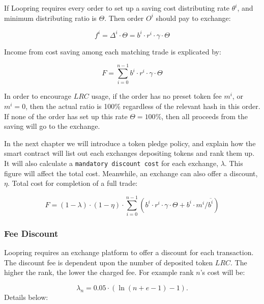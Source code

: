 \documentclass[UTF8,nofonts]{article}
\begin{document}
If Loopring requires every order to set up a saving cost distributing rate $\theta^i$, and minimum distributing ratio is $\Theta$. Then order $O^i$ should pay to exchange: 


\begin{equation*}
f^i = \Delta^i \cdot \Theta = b^i \cdot r^i \cdot \gamma \cdot \Theta
\end{equation*}

Income from cost saving among each matching trade is explicated by:

\begin{equation*}
F = \sum^{n-1}_{i=0} b^i \cdot r^i \cdot \gamma \cdot \Theta
\end{equation*}

In order to encourage $LRC$ usage, if the order has no preset token fee $m^i$, or $m^i=0$, then the actual ratio is 100\% regardless of the relevant hash in this order. If none of the order has set up this rate $\Theta=100\%$, then all proceeds from the saving will go to the exchange.

In the next chapter we will introduce a token pledge policy, and explain how the smart contract will list out each exchanges depositing tokens and rank them up. It will also calculate a \texttt{mandatory discount cost} for each exchange, $\lambda$. This figure will affect the total cost. Meanwhile, an exchange can also offer a discount, $\eta$. Total cost for completion of a full trade: 

\begin{equation*}
F =(1-\lambda)\cdot (1-\eta) \cdot \sum^{n-1}_{i=0} (b^i \cdot r^i \cdot \gamma \cdot \Theta + b^i \cdot m^i / \overline{b^i})
\end{equation*}


\subsubsection{Fee Discount}
Loopring requires an exchange platform to offer a discount for each transaction. The discount fee is dependent upon the number of deposited token $LRC$. The higher the rank, the lower the charged fee. For example rank $n$'s cost will be:

$$\lambda_{n} = 0.05\cdot(\ln (n+e-1) - 1)\text{.}$$
Details below:
\end{document}
